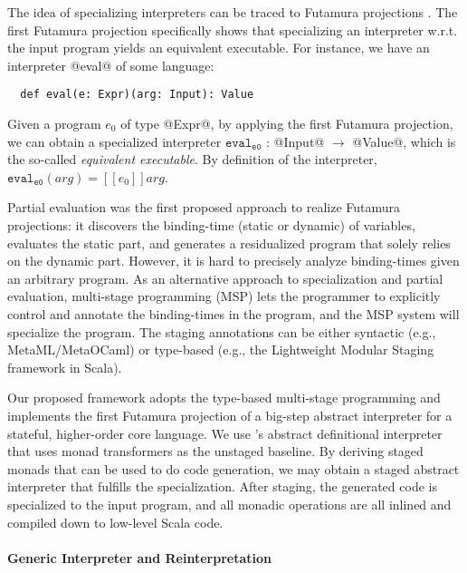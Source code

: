 The idea of specializing interpreters can be traced to Futamura
projections \cite{Futamura1999, futamura1971partial}.
The first Futamura projection specifically shows that
specializing an interpreter w.r.t. the input program yields an
equivalent executable.  For instance, we have an interpreter @eval@ of
some language:
\begin{lstlisting}
  def eval(e: Expr)(arg: Input): Value
\end{lstlisting}
Given a program $e_0$ of type @Expr@, by applying the first Futamura
projection, we can obtain a specialized interpreter
$\texttt{eval}_{\texttt{e0}}$ : @Input@ $\to$ @Value@, which is the so-called
\textit{equivalent executable}. By definition of the interpreter,
$\texttt{eval}_{\texttt{e0}}(arg) = [\![ e_0 ]\!] arg $.

Partial evaluation \cite{DBLP:books/daglib/0072559} was the first
proposed approach to realize Futamura projections: it discovers the
binding-time (static or dynamic) of variables, evaluates the static
part, and generates a residualized program that solely relies on the dynamic
part. However, it is hard to precisely analyze binding-times given an
arbitrary program. As an alternative approach to specialization and
partial evaluation, multi-stage programming (MSP) \cite{taha1999multi, DBLP:conf/pepm/TahaS97}
lets the programmer to explicitly control and annotate the
binding-times in the program, and the MSP system will specialize the
program. The staging annotations can be either syntactic (e.g.,
MetaML/MetaOCaml) or type-based (e.g., the Lightweight Modular Staging framework
\cite{DBLP:conf/gpce/RompfO10} in Scala).

Our proposed framework adopts the type-based multi-stage programming
and implements the first Futamura projection of a big-step abstract
interpreter for a stateful, higher-order core language.  We use
\citet{DBLP:journals/pacmpl/DaraisLNH17}'s abstract definitional
interpreter that uses monad transformers as the unstaged baseline. By
deriving staged monads that can be used to do code generation, we may
obtain a staged abstract interpreter that fulfills the specialization.
After staging, the generated code is specialized to the input program,
and all monadic operations are all inlined and compiled down to low-level
Scala code.



\paragraph{Generic Interpreter and Reinterpretation}

